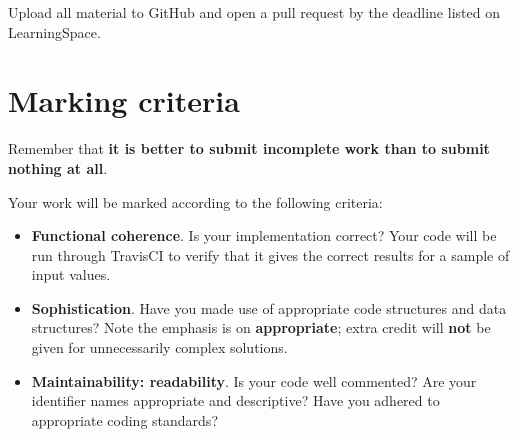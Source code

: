 \documentclass{../../../fal_assignment}
\begin{document}
Upload all material to GitHub and open a pull request by the deadline listed on LearningSpace.

\section*{Marking criteria}

Remember that \textbf{it is better to submit incomplete work than to submit nothing at all}.

Your work will be marked according to the following criteria:
\begin{itemize}
	\item \textbf{Functional coherence}. Is your implementation correct?
		Your code will be run through TravisCI to verify that it gives the correct results for a sample of input values.
	\item \textbf{Sophistication}. Have you made use of appropriate code structures and data structures?
		Note the emphasis is on \textbf{appropriate}; extra credit will \textbf{not} be given for unnecessarily complex solutions.
	\item \textbf{Maintainability: readability}. Is your code well commented? Are your identifier names appropriate and descriptive?
		Have you adhered to appropriate coding standards?
\end{itemize}
\end{document}
